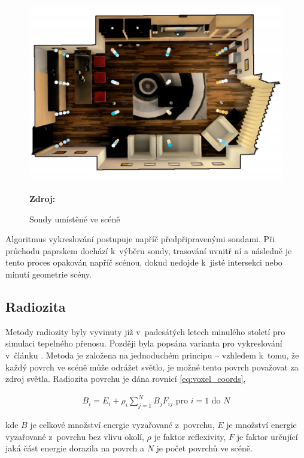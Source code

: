 \begin{figure}[H]
	\centering
	\includegraphics[scale=0.25]{obrazky-figures/light_field_probes.png}
	\caption{Sondy umístěné ve scéně}
	\textbf{Zdroj: \cite{light_field_probes}}
	\label{fig:ray_marching}
\end{figure}

Algoritmus vykreslování postupuje napříč předpřipravenými sondami. Při průchodu paprskem dochází k~výběru sondy, trasování uvnitř ní a následně je tento proces opakován napříč scénou, dokud nedojde k~jisté intersekci nebo minutí geometrie scény.

\subsection{Radiozita}
Metody radiozity byly vyvinuty již v~padesátých letech minulého století pro simulaci tepelného přenosu. Později byla popsána varianta pro vykreslování v~článku \cite{radiosity}. Metoda je založena na jednoduchém principu – vzhledem k~tomu, že každý povrch ve scéně může odrážet světlo, je možné tento povrch považovat za zdroj světla. Radiozita povrchu je dána rovnicí \ref{eq:voxel_coords},


\begin{equation} \label{eq:voxel_coords}
	\begin{gathered}
		B_i = E_i + \rho_i \sum^N_{j = 1}B_jF_{ij} \text{ pro } i = 1 \text{ do } N
	\end{gathered}
\end{equation}

kde $B$ je celkové množství energie vyzařované z~povrchu, $E$ je množství energie vyzařované z~povrchu bez vlivu okolí, $\rho$ je faktor reflexivity, $F$ je faktor určující jaká část energie dorazila na povrch a $N$ je počet povrchů ve scéně.

